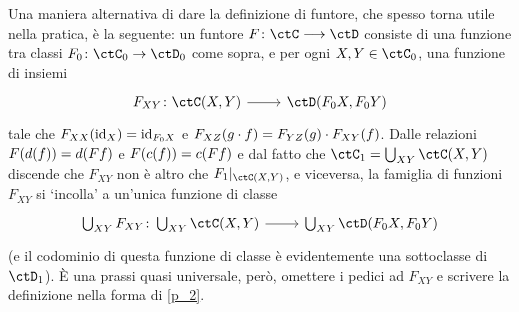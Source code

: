 \begin{remark}\label{def_alternativa_funtore}
 Una maniera alternativa di dare la definizione di funtore, che spesso torna utile nella pratica, è la seguente: un funtore \(F \colon \ctC\fun\ctD\) consiste di una funzione tra classi \(F_0 \colon \ctC_0\to \ctD_0\) come sopra, e per ogni \(X,Y\in\ctC_0\), una funzione di insiemi
 \[\dmFun{F_{XY}}{\Hom{\ctC}(X,Y)}{\Hom{\ctD}(F_0X,F_0Y)}
 \]
 tale che \(F_{XX}(\mathrm{id}_X) = \mathrm{id}_{F_0X}\) e \(F_{XZ}(g\cdot f) = F_{YZ}(g)\cdot F_{XY}(f)\). Dalle relazioni \(F(d(f))=d(Ff)\) e \(F(c(f))=c(Ff)\) e dal fatto che \(\ctC_1 = \bigcup_{XY}\Hom{\ctC}(X,Y)\) discende che \(F_{XY}\) non è altro che \(F_1|_{\Hom{\ctC}(X,Y)}\), e viceversa, la famiglia di funzioni \(F_{XY}\) si `incolla' a un'unica funzione di classe
 \[\dmFun{\bigcup_{XY}F_{XY}}{\bigcup_{XY}\Hom{\ctC}(X,Y)}{\bigcup_{XY}\Hom{\ctD}(F_0X,F_0Y)}\]
 (e il codominio di questa funzione di classe è evidentemente una sottoclasse di \(\ctD_1\)). È una prassi quasi universale, però, omettere i pedici ad \(F_{XY}\) e scrivere la definizione nella forma di \ref{p_2}.
\end{remark}
